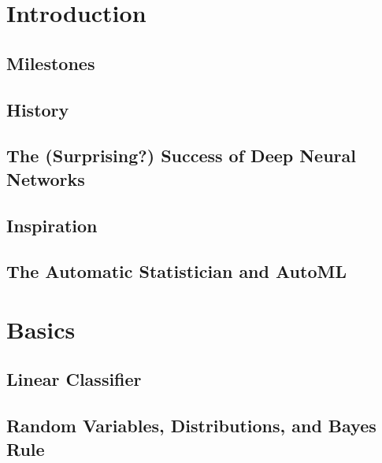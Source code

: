 \chapter{Introduction} %

	\section{Milestones} %

	\section{History} %

	\section{The (Surprising?) Success of Deep Neural Networks} %

	\section{Inspiration} %

	\section{The Automatic Statistician and AutoML} %

\chapter{Basics} %

	\section{Linear Classifier} %

	\section{Random Variables, Distributions, and Bayes Rule} %

